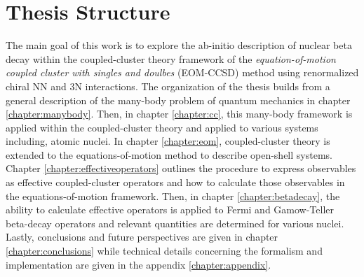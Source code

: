 \documentclass[../thesis.tex]{subfiles}
\begin{document}
\section{Thesis Structure}

The main goal of this work is to explore the ab-initio description of nuclear beta decay within the coupled-cluster theory framework of the \textit{equation-of-motion coupled cluster with singles and doulbes} (EOM-CCSD) method using renormalized chiral NN and 3N interactions.  The organization of the thesis builds from a general description of the many-body problem of quantum mechanics in chapter \ref{chapter:manybody}. Then, in chapter \ref{chapter:cc}, this many-body framework is applied within the coupled-cluster theory and applied to various systems including, atomic nuclei. In chapter \ref{chapter:eom}, coupled-cluster theory is extended to the equations-of-motion method to describe open-shell systems.  Chapter \ref{chapter:effectiveoperators} outlines the procedure to express observables as effective coupled-cluster operators and how to calculate those observables in the equations-of-motion framework.  Then, in chapter \ref{chapter:betadecay}, the ability to calculate effective operators is applied to Fermi and Gamow-Teller beta-decay operators and relevant quantities are determined for various nuclei.  Lastly, conclusions and future perspectives are given in chapter \ref{chapter:conclusions} while technical details concerning the formalism and implementation are given in the appendix \ref{chapter:appendix}.
\end{document}

